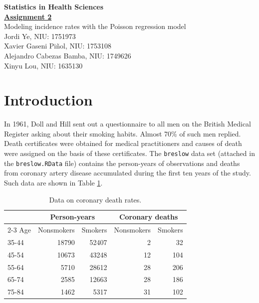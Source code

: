 \documentclass[10pt,a4paper,twoside]{article}\usepackage[]{graphicx}\usepackage[]{xcolor}
\begin{document}
\begin{titlepage}
  \begin{center}
    \vspace*{4cm}
    \textbf{\Huge Statistics in Health Sciences}
    \vspace{4em}\\
    \textbf{\huge \underline{Assignment 2}} \\[1em]
    \large{Modeling incidence rates with the Poisson regression model}\\
    [1em]
    Jordi Ye, NIU: 1751973\\
    Xavier Gaseni Piñol, NIU: 1753108\\
    Alejandro Cabezas Bamba, NIU: 1749626\\
    Xinyu Lou, NIU: 1635130
    \vfill
  \end{center}
\end{titlepage}

\tableofcontents

\newpage

\section{Introduction}
\label{sec:introduccion}
In 1961, Doll and Hill\citep{DollHill} sent out a questionnaire to all men on the British Medical Register asking about their smoking habits. Almost 70\% of such men replied. Death certificates were obtained for medical practitioners and causes of death were assigned on the basis of these certificates. The \texttt{breslow} data set\citep{breslow} (attached in the \texttt{breslow.RData} file) contains the person-years of observations and deaths from coronary artery disease accumulated during the first ten years of the study. Such data are shown in Table \ref{tab:coronarydeath}.
\begin{table}[H]
\centering
\begin{tabular}{lrrrr}
   & \multicolumn{2}{c}{Person-years} & \multicolumn{2}{c}{Coronary deaths} \\
\cline{2-3} \cline{4-5}
Age & Nonsmokers & Smokers & Nonsmokers & Smokers \\
\hline
 35-44 & 18790 & 52407 & 2 & 32 \\ 
  45-54 & 10673 & 43248 & 12 & 104 \\ 
  55-64 & 5710 & 28612 & 28 & 206 \\ 
  65-74 & 2585 & 12663 & 28 & 186 \\ 
  75-84 & 1462 & 5317 & 31 & 102 \\ 
   \hline
\end{tabular}
\caption{Data on coronary death rates.} 
\label{tab:coronarydeath}
\end{table}
\end{document}
